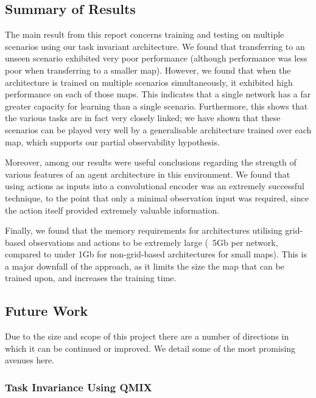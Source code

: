 \subsection{Summary of Results}

The main result from this report concerns training and testing on multiple scenarios using our task invariant architecture. We found that transferring to an unseen scenario exhibited very poor performance (although performance was less poor when transferring to a smaller map). However, we found that when the architecture is trained on multiple scenarios simultaneously, it exhibited high performance on each of those maps. This indicates that a single network has a far greater capacity for learning than a single scenario. Furthermore, this shows that the various tasks are in fact very closely linked; we have shown that these scenarios can be played very well by a generalisable architecture trained over each map, which supports our partial observability hypothesis.



Moreover, among our results were useful conclusions regarding the strength of various features of an agent architecture in this environment. We found that using actions as inputs into a convolutional encoder was an extremely successful technique, to the point that only a minimal observation input was required, since the action itself provided extremely valuable information.

Finally, we found that the memory requirements for architectures utilising grid-based observations and actions to be extremely large (~5Gb per network, compared to under 1Gb for non-grid-based architectures for small maps). This is a major downfall of the approach, as it limits the size the map that can be trained upon, and increases the training time.





\subsection{Future Work}

Due to the size and scope of this project there are a number of directions in which it can be continued or improved. We detail some of the most promising avenues here.


\subsubsection{Task Invariance Using QMIX}

